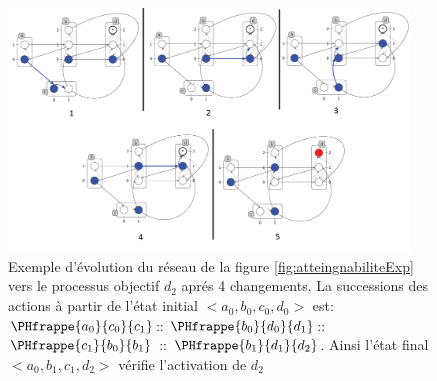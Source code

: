 \begin{figure}[!ht]
    \center
    \includegraphics[width=0.95\textwidth]
    {./images/evolution.png}
    \caption{Exemple d'évolution du réseau de la figure \ref{fig:atteingnabiliteExp} vers le processus objectif $d_2$ aprés 4 changements. La successions des actions à partir de l'état initial $<a_0, b_0, c_0, d_0>$ est: $\PHfrappe{a_0}{c_0}{c_1}$:: $\PHfrappe{b_0}{d_0}{d_1}$:: $\PHfrappe{c_1}{b_0}{b_1}$ :: $\PHfrappe{b_1}{d_1}{d_2}$. Ainsi l'état final $<a_0, b_1, c_1, d_2>$ vérifie l'activation de $d_2$}
    \label{evolution}
\end{figure}